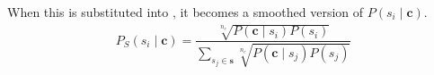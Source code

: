 \documentclass{article} %
\renewcommand{\c}{\mathbf{c}}
\newcommand{\s}{\mathbf{s}}
\providecommand{\DIFaddbegin}{} %
\providecommand{\DIFaddend}{} %
\providecommand{\DIFdelbegin}{} %
\providecommand{\DIFdelend}{} %
\begin{document}
When this is substituted into , it becomes a smoothed version of $P(s_{i} \mid \c)$.
\begin{equation} \label{eq:generalwsdsmoothed}
\DIFdelbegin %
\DIFdelend \DIFaddbegin \begin{aligned}
P_S(s_{i}\mid\c) %
%
=\dfrac{\sqrt[n_c]{P(\c\mid s_{i})P(s_{i})}}
{\sum_{s_{j}\in\s} \sqrt[n_c]{P(\c \mid s_{j})P(s_{j})}} \\
%
\end{aligned}
\DIFaddend \end{equation}
\DIFaddbegin 
\end{document}
